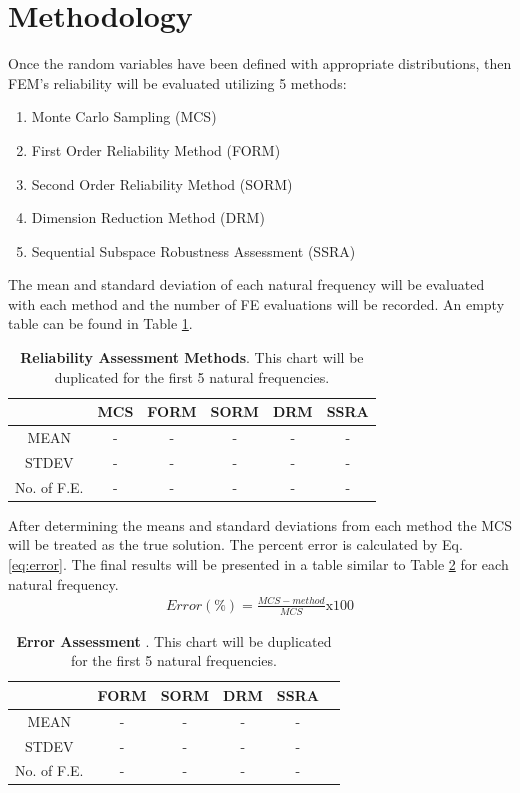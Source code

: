 \documentclass[paper=a4, fontsize=12pt]{scrartcl} %
\begin{document}
\section*{Methodology}
%
Once the random variables have been defined with appropriate distributions, then FEM's reliability will be evaluated utilizing 5 methods: 
%
\begin{enumerate}
  \item Monte Carlo Sampling (MCS)
  \item First Order Reliability Method (FORM)
  \item Second Order Reliability Method (SORM)
  \item Dimension Reduction Method (DRM)
  \item Sequential Subspace Robustness Assessment (SSRA)
\end{enumerate}
%
The mean and standard deviation of each natural frequency will be evaluated with each method and the number of FE evaluations will be recorded. An empty table can be found in Table \ref{table:METHODS}.
%
\begin{table}[H]
\centering
\caption{\textbf{Reliability Assessment Methods}. This chart will be duplicated for the first 5 natural frequencies.}
\begin{tabular}{| c || c | c | c | c | c |}
\hline
		 & MCS & FORM & SORM  & DRM & SSRA\\ \hline
		\hline
		MEAN  &  -  & -  & - & - & - \\ \hline
		STDEV  &  -  & -  & - & - & -  \\ \hline
		No. of F.E.  &  -  & -  & - & - & -\\ \hline
\end{tabular}
\label{table:METHODS}
\end{table}
% 
After determining the means and standard deviations from each method the MCS will be treated as the true solution. The percent error is calculated by Eq. \ref{eq:error}. The final results will be presented in a table similar to Table \ref{table:ERROR_MCS} for each natural frequency.
%
\begin{gather}
	Error (\%) = \frac{MCS-method}{MCS} \text{x} 100
	\label{eq:error}
\end{gather}
%
\begin{table}[H]
\centering
\caption{\textbf{Error Assessment }. This chart will be duplicated for the first 5 natural frequencies.}
\begin{tabular}{| c || c | c | c | c | c |}
\hline
		 & FORM & SORM  & DRM & SSRA\\ \hline
		\hline
		MEAN   & -  & - & - & - \\ \hline
		STDEV  & -  & - & - & -  \\ \hline
		No. of F.E.  & -  & - & - & -\\ \hline
\end{tabular}
\label{table:ERROR_MCS}
\end{table}

%
%



\end{document}
